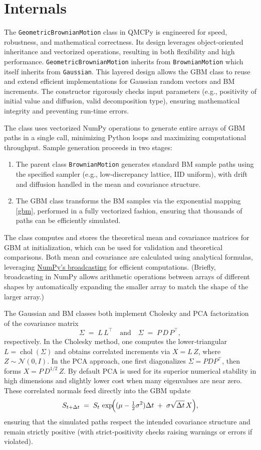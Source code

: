 \documentclass{article}
\begin{document}
\section{Internals}

The \texttt{GeometricBrownianMotion} class in QMCPy is engineered for speed, robustness, and mathematical correctness. Its design leverages object-oriented inheritance and vectorized operations, resulting in both flexibility and high performance.
\texttt{GeometricBrownianMotion} inherits from \texttt{BrownianMotion} which itself inherits from \texttt{Gaussian}. This layered design allows the GBM class to reuse and extend efficient implementations for Gaussian random vectors and BM increments.
The constructor rigorously checks input parameters (e.g., positivity of initial value and diffusion, valid decomposition type), ensuring mathematical integrity and preventing run-time errors.

The class uses vectorized NumPy operations to generate entire arrays of GBM paths in a single call, minimizing Python loops and maximizing computational throughput. Sample generation proceeds in two stages:
\begin{enumerate}
\item 
The parent class \texttt{BrownianMotion} generates standard BM sample paths using the specified sampler (e.g., low-discrepancy lattice, IID uniform), with drift and diffusion handled in the mean and covariance structure.
\item  The GBM class transforms the BM samples via the exponential mapping \eqref{gbm}, performed in a fully vectorized fashion, ensuring that thousands of paths can be efficiently simulated.
\end{enumerate}
The class computes and stores the theoretical mean and covariance matrices for GBM at initialization, which can be used for validation and theoretical comparisons. Both mean and covariance are calculated using analytical formulas, leveraging \href{https://numpy.org/devdocs/user/basics.broadcasting.html}{NumPy’s broadcasting} for efficient computations. (Briefly, broadcasting in NumPy allows arithmetic operations between arrays of different shapes by automatically expanding the smaller array to match the shape of the larger array.)

 The Gaussian and BM classes both implement Cholesky and PCA factorization of the covariance matrix
\[
\Sigma \;=\; L\,L^{\!\top}
\quad\text{and}\quad
\Sigma \;=\; P\,D\,P^{\!\top},
\]
respectively.  In the Cholesky method, one computes the lower‐triangular $L=\operatorname{chol}(\Sigma)$ and obtains correlated increments via $X=L\,Z$, where $Z\sim\mathcal{N}(0,I)$.  In the PCA approach, one first diagonalizes $\Sigma=PDP^{\!\top}$, then forms $X = P\,D^{1/2}\,Z$.  By default PCA is used for its superior numerical stability in high dimensions and slightly lower cost when many eigenvalues are near zero.  These correlated normals feed directly into the GBM update
\[
S_{t+\Delta t} \;=\; S_t\,\exp\!\Bigl((\mu - \tfrac12\sigma^2)\Delta t \;+\;\sigma\sqrt{\Delta t}\,X\Bigr),
\]
ensuring that the simulated paths respect the intended covariance structure and remain strictly positive (with strict‐positivity checks raising warnings or errors if violated).
\end{document}
